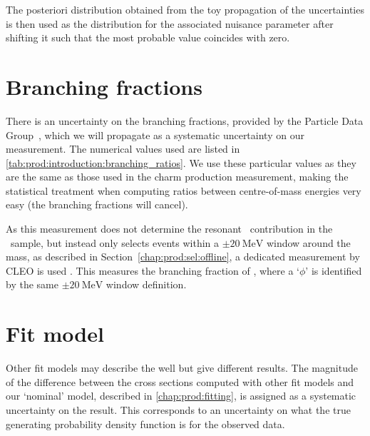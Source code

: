 The posteriori distribution obtained from the toy propagation of the uncertainties is then used as the distribution
for the associated nuisance parameter after shifting it such that the most probable value coincides with zero.

\begin{table}
  \caption{%
    Relative uncertainty on the \PDzero cross-section, in \PDzero \pTy\ bins, 
    due to the finite sample size and hadronic interaction uncertainty on the 
    tracking efficiency correction measurement.
  }
  \label{tab:syst:tracking:DzToKpi}
  \centering
\end{table}

\section{Branching fractions}
\label{chap:prod:syst:bf}

There is an uncertainty on the branching fractions, provided by the Particle 
Data Group~\cite{PDG2014}, which we will propagate as a systematic uncertainty 
on our measurement. The numerical values used are listed in 
\cref{tab:prod:introduction:branching_ratios}. We use these particular values 
as they are the same as those used in the  charm production 
measurement, making the statistical treatment when computing ratios between 
centre-of-mass energies very easy (the branching fractions will cancel).

As this measurement does not determine the resonant \phiToKK\ contribution in 
the \DspTophipi\ sample, but instead only selects events within a 
$\pm\SI{20}{\MeV}$ window around the \Pphi mass, as described in 
Section~\ref{chap:prod:sel:offline}, a dedicated measurement by CLEO is used 
\cite{Alexander:2008aa}.
This measures the branching fraction of \DspTophipi, where a `$\phi$' is 
identified by the same $\pm\SI{20}{\MeV}$ window definition.

\section{Fit model}
\label{chap:prod:syst:fitting}

Other fit models may describe the well but give different results.
The magnitude of the difference between the cross sections computed with other 
fit models and our `nominal' model, described in \cref{chap:prod:fitting}, is 
assigned as a systematic uncertainty on the result.
This corresponds to an uncertainty on what the true generating probability 
density function is for the observed data.


